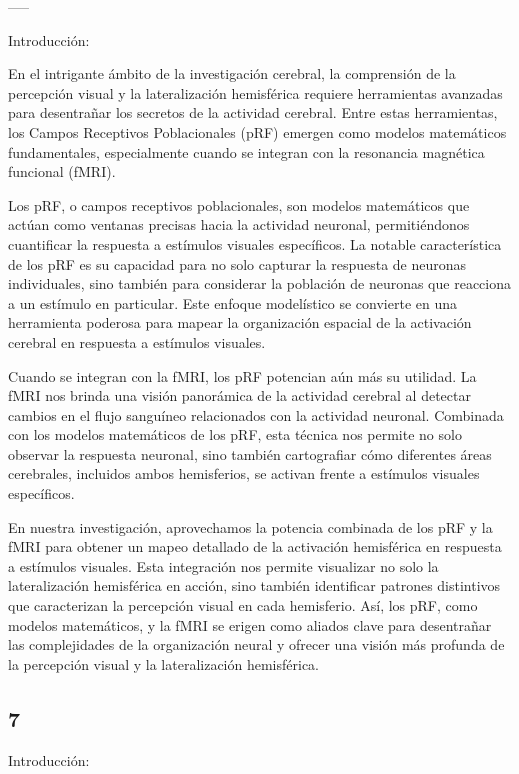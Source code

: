 \documentclass{article}
\begin{document}
	-----
	
	Introducción:
	
	En el intrigante ámbito de la investigación cerebral, la comprensión de la percepción visual y la lateralización hemisférica requiere herramientas avanzadas para desentrañar los secretos de la actividad cerebral. Entre estas herramientas, los Campos Receptivos Poblacionales (pRF) emergen como modelos matemáticos fundamentales, especialmente cuando se integran con la resonancia magnética funcional (fMRI).
	
	Los pRF, o campos receptivos poblacionales, son modelos matemáticos que actúan como ventanas precisas hacia la actividad neuronal, permitiéndonos cuantificar la respuesta a estímulos visuales específicos. La notable característica de los pRF es su capacidad para no solo capturar la respuesta de neuronas individuales, sino también para considerar la población de neuronas que reacciona a un estímulo en particular. Este enfoque modelístico se convierte en una herramienta poderosa para mapear la organización espacial de la activación cerebral en respuesta a estímulos visuales.
	
	Cuando se integran con la fMRI, los pRF potencian aún más su utilidad. La fMRI nos brinda una visión panorámica de la actividad cerebral al detectar cambios en el flujo sanguíneo relacionados con la actividad neuronal. Combinada con los modelos matemáticos de los pRF, esta técnica nos permite no solo observar la respuesta neuronal, sino también cartografiar cómo diferentes áreas cerebrales, incluidos ambos hemisferios, se activan frente a estímulos visuales específicos.
	
	En nuestra investigación, aprovechamos la potencia combinada de los pRF y la fMRI para obtener un mapeo detallado de la activación hemisférica en respuesta a estímulos visuales. Esta integración nos permite visualizar no solo la lateralización hemisférica en acción, sino también identificar patrones distintivos que caracterizan la percepción visual en cada hemisferio. Así, los pRF, como modelos matemáticos, y la fMRI se erigen como aliados clave para desentrañar las complejidades de la organización neural y ofrecer una visión más profunda de la percepción visual y la lateralización hemisférica.
	
	\subsection{7}
	
	Introducción:
	
\end{document}
